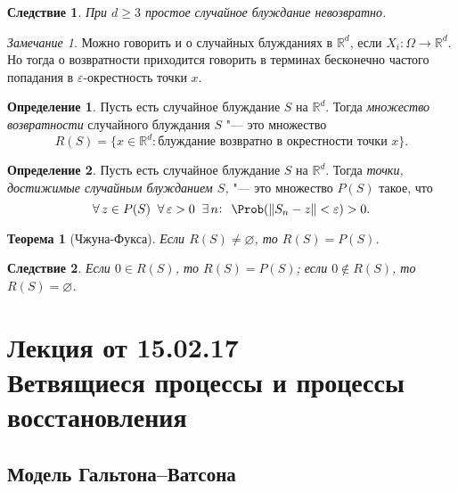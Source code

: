 \documentclass[a4paper]{article}
\theoremstyle{plain}
\newtheorem{thm}{Теорема}[section]
\newtheorem*{cor}{Следствие}
\theoremstyle{definition}
\newtheorem{defn}{Определение}[section]
\theoremstyle{remark}
\newtheorem*{rem}{Замечание}
\begin{document}
\begin{cor}
  При $d \geqslant 3$ простое случайное блуждание невозвратно.
\end{cor}

\begin{rem}
  \sloppy
  Можно говорить и о случайных блужданиях в $\mathbb{R}^d$, если $X_{i}: \Omega \rightarrow \mathbb{R}^d$. Но тогда о возвратности приходится говорить в терминах бесконечно частого попадания в $\varepsilon$-окрестность точки $x$.
\end{rem}

\begin{defn}
  Пусть есть случайное блуждание $S$ на $\mathbb{R}^d$. Тогда \emph{множество возвратности} случайного блуждания $S$ "--- это множество
  \begin{equation*}
    R(S) = \lbrace x \in \mathbb{R}^d : \text{блуждание возвратно в окрестности точки } x \rbrace \text{.}
  \end{equation*}
\end{defn}

\begin{defn}
  Пусть есть случайное блуждание $S$ на $\mathbb{R}^d$. Тогда \emph{точки, достижимые случайным блужданием $S$,} "--- это множество $P(S)$ такое, что
  \begin{equation*}
    \forall\, z \in P(S) \; \; \forall\, \varepsilon > 0 \; \; \exists\, n \negmedspace : \; \, \Prob( \| S_{n} - z \| < \varepsilon) > 0 \text{.}
  \end{equation*}
\end{defn}

\begin{thm}[Чжуна-Фукса]
  Если $R(S) \neq \varnothing$, то $R(S) = P(S)$.
\end{thm}

\begin{cor}
  Если $0 \in R(S)$, то $R(S) = P(S)$; если
  $0 \notin R(S)$, то  $R(S) = \varnothing$.
\end{cor}

\section[Лекция от 15.02.17. Ветвящиеся процессы и процессы восстановления]{Лекция от 15.02.17\\ {\large Ветвящиеся процессы и процессы восстановления}}

\subsection{Модель Гальтона--Ватсона}
\end{document}
